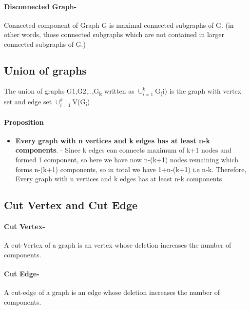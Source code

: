 \paragraph{Disconnected Graph-}Connected component of Graph G is maximal connected
subgraphs of G. (in other words, those connected
subgraphs which are not contained in larger connected
subgraphs of G.)

\subsection{Union of graphs}
The union of graphs G1,G2,..,G\textsubscript{k} written as \(\cup_{i=1}^k \)G\textsubscript(i) is the graph
with vertex set and edge set \(\cup_{i=1}^k \)V(G\textsubscript{i})

\paragraph{Proposition}
\begin{itemize}
    \item \textbf{Every graph with n vertices and k edges has
    at least n-k components}. - Since k edges can connects maximum of k+1 nodes and formed 1 component, 
    so here we have now n-(k+1) nodes remaining which forms n-(k+1) components, so in total we have 1+n-(k+1)
    i.e n-k. Therefore, Every graph with n vertices and k edges has
    at least n-k components
\end{itemize}

\subsection{Cut Vertex and Cut Edge}
\paragraph{Cut Vertex-}A cut-Vertex of a graph is an vertex whose deletion
increases the number of components.

\paragraph{Cut Edge-}A cut-edge of a graph is an edge whose deletion
increases the number of components.


